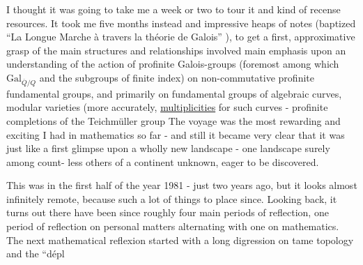  I thought it was going to take me a week or two to tour it and 
kind of recense resources. It took me five months instead  and  impressive
heaps of notes (baptized  ``La Longue Marche à travers la théorie de
Galois'' ),  to get a  first,  approximative grasp of  the
main structures and relationships involved  main emphasis  upon \margin{/}
an understanding of the action of profinite Galois-groups (foremost
among which $\mathrm{Gal}_{\overline{Q}/Q}$ and the subgroups of finite index) on non-commutative
profinite fundamental groups,  and primarily on fundamental groups of
algebraic curves, modular varieties (more accurately,  \uline{multiplicities}\hand{)}
for such curves -   profinite completions of the Teichmüller group
The voyage was the most rewarding and exciting I had in mathematics so
far  -  and still it became very clear that it was just like a first
glimpse upon a wholly new landscape - one landscape surely among count-%
less others of a continent unknown,  eager to be discovered.

This was in the first half of the year 1981  -  just two years ago,
 but it looks almost infinitely remote,  because such a lot of things to
place since.  Looking back,  it turns out there have been since roughly
four main  periods of reflection,  one period of reflection on personal
matters alternating with one on mathematics.  The next mathematical
reflexion started with a long digression on tame topology and the ``dépl

